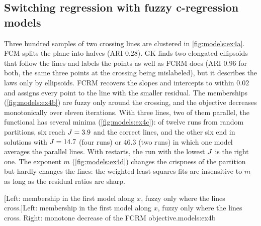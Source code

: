 
\subsection{Switching regression with fuzzy c-regression models}

Three hundred samples of two crossing lines are clustered in \cref{fig:models:ex4a}. FCM splits the plane into halves (ARI $0.28$). GK finds two elongated ellipsoids that follow the lines and labels the points as well as FCRM does (ARI $0.96$ for both, the same three points at the crossing being mislabeled), but it describes the laws only by ellipsoids. FCRM recovers the slopes and intercepts to within $0.02$ and assigns every point to the line with the smaller residual. The memberships (\cref{fig:models:ex4b}) are fuzzy only around the crossing, and the objective decreases monotonically over eleven iterations. With three lines, two of them parallel, the functional has several minima (\cref{fig:models:ex4c}): of twelve runs from random partitions, six reach $J=3.9$ and the correct lines, and the other six end in solutions with $J=14.7$ (four runs) or $46.3$ (two runs) in which one model averages the parallel lines. With  restarts, the run with the lowest $J$ is the right one. The exponent $m$ (\cref{fig:models:ex4d}) changes the crispness of the partition but hardly changes the lines: the weighted least-squares fits are insensitive to $m$ as long as the residual ratios are sharp.

[Left: membership in the first model along $x$, fuzzy only where the lines cross.]{Left: membership in the first model along $x$, fuzzy only where the lines cross. Right: monotone decrease of the FCRM objective.}{models:ex4b}

